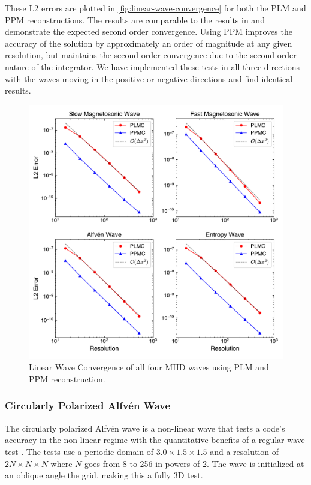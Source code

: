 \documentclass[modern, linenumbers]{aastex631}
\newcommand*{\img}[1]{%
    \raisebox{-.05\baselineskip}{%
        \texttt{[image: \#1]}%
    }%
}
\begin{document}
These L2 errors are plotted in \autoref{fig:linear-wave-convergence} for both the PLM and PPM reconstructions. The results are comparable to the results in \cite{stone_2009} and demonstrate the expected second order convergence. Using PPM improves the accuracy of the solution by approximately an order of magnitude at any given resolution, but maintains the second order convergence due to the second order nature of the integrator. We have implemented these tests in all three directions with the waves moving in the positive or negative directions and find identical results.

\begin{figure}[ht!]
    \includegraphics[width=\linewidth]{linear_convergence.pdf}
    \caption{Linear Wave Convergence of all four MHD waves using PLM and PPM reconstruction. \href{https://zenodo.org/records/10927223}{\img{zenodo-gradient-200.png}}}
    \label{fig:linear-wave-convergence}
\end{figure}

\subsubsection{Circularly Polarized Alfv\'en Wave}
\label{sec:cpaw}

The circularly polarized Alfv\'en wave is a non-linear wave that tests a code's accuracy in the non-linear regime with the quantitative benefits of a regular wave test \citep{Toth1996}. The tests use a periodic domain of $3.0\times1.5\times1.5$ and a resolution of $2N\times N \times N$ where $N$ goes from 8 to 256 in powers of 2. The wave is initialized at an oblique angle the grid, making this a fully 3D test.
\end{document}
